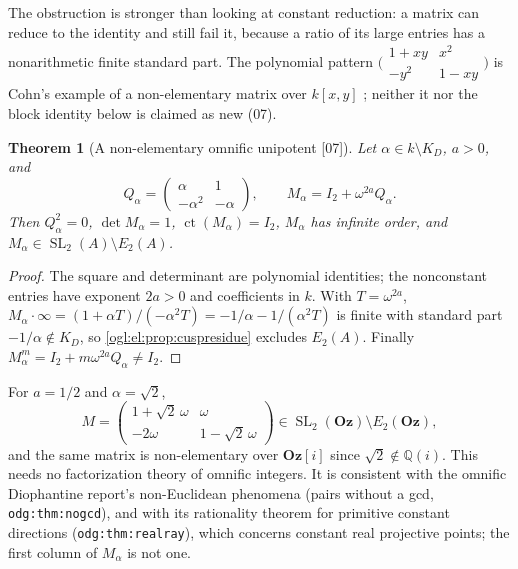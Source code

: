 \documentclass[11pt,oneside]{article}
\numberwithin{equation}{section}
\newtheorem{theorem}{Theorem}[section]
\theoremstyle{definition}
\theoremstyle{remark}
\newcommand{\Oz}{\mathbf{Oz}}
\newcommand{\GOz}{\mathbf{Oz}[i]}
\newcommand{\Q}{\mathbb Q}
\newcommand{\ct}{\operatorname{ct}}
\newcommand{\SL}{\operatorname{SL}}
\newcommand{\src}[1]{\textup{\textsf{\small[#1]}}}
\newcommand{\replabel}[1]{\nolinkurl{#1}}
\begin{document}
The obstruction is stronger than looking at constant reduction: a matrix can
reduce to the identity and still fail it, because a ratio of its large entries
has a nonarithmetic finite standard part. The polynomial pattern
$\bigl(\begin{smallmatrix}1+xy&x^2\\-y^2&1-xy\end{smallmatrix}\bigr)$ is Cohn's
example of a non-elementary matrix over $k[x,y]$ \cite[Section~7, p.~26]{Cohn};
neither it nor the block identity below is claimed as new (07).

\begin{theorem}[A non-elementary omnific unipotent \src{07}]\label{ogl:el:thm:nonel}
Let $\alpha\in k\setminus K_D$, $a>0$, and
\[
 Q_\alpha=\begin{pmatrix}\alpha&1\\-\alpha^2&-\alpha\end{pmatrix},
 \qquad M_\alpha=I_2+\omega^{2a}Q_\alpha .
\]
Then $Q_\alpha^2=0$, $\det M_\alpha=1$, $\ct(M_\alpha)=I_2$, $M_\alpha$ has
infinite order, and $M_\alpha\in\SL_2(A)\setminus E_2(A)$.
\end{theorem}
\begin{proof}
The square and determinant are polynomial identities; the nonconstant entries
have exponent $2a>0$ and coefficients in $k$. With $T=\omega^{2a}$,
$M_\alpha\cdot\infty=(1+\alpha T)/(-\alpha^2T)=-1/\alpha-1/(\alpha^2T)$ is finite
with standard part $-1/\alpha\notin K_D$, so \cref{ogl:el:prop:cuspresidue}
excludes $E_2(A)$. Finally $M_\alpha^m=I_2+m\omega^{2a}Q_\alpha\ne I_2$.
\end{proof}

For $a=1/2$ and $\alpha=\sqrt2$,
\begin{equation}\label{ogl:el:eq:exampleM}
 M=\begin{pmatrix}1+\sqrt2\,\omega&\omega\\-2\omega&1-\sqrt2\,\omega\end{pmatrix}
 \in\SL_2(\Oz)\setminus E_2(\Oz),
\end{equation}
and the same matrix is non-elementary over $\GOz$ since $\sqrt2\notin\Q(i)$.
This needs no factorization theory of omnific integers. It is consistent with the
omnific Diophantine report's non-Euclidean phenomena (pairs without a gcd,
\replabel{odg:thm:nogcd}), and with its rationality theorem for primitive
constant directions (\replabel{odg:thm:realray}), which concerns constant real
projective points; the first column of $M_\alpha$ is not one.
\end{document}
